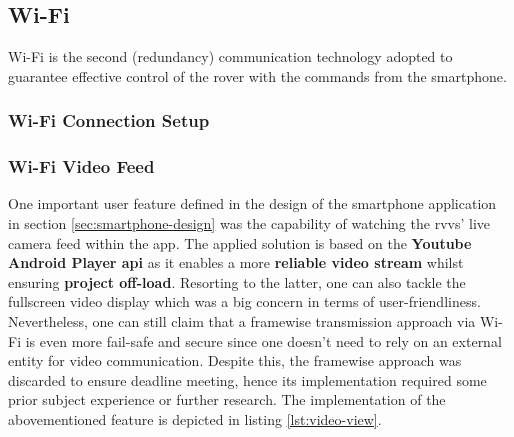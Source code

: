 \subsection{Wi-Fi}%
\label{sec:wifi-implem}
%
Wi-Fi is the second (redundancy) communication technology adopted to guarantee effective control of the rover with the commands from the smartphone.
%
\subsubsection{Wi-Fi Connection Setup}
%
\subsubsection{Wi-Fi Video Feed}
%
One important user feature defined in the design of the smartphone application in section \ref{sec:smartphone-design} was the capability of watching the \gls{rvvs}' live camera feed within the app. The applied solution is based on the \textbf{Youtube Android Player \gls{api}} \cite{yt_api} as it enables a more \textbf{reliable video stream} whilst ensuring \textbf{project off-load}. Resorting to the latter, one can also tackle the fullscreen video display which was a big concern in terms of user-friendliness. Nevertheless, one can still claim that a framewise transmission approach via Wi-Fi is even more fail-safe and secure since one doesn't need to rely on an external entity for video communication.
Despite this, the framewise approach was discarded to ensure deadline meeting, hence its implementation required some prior subject experience or further research. The implementation of the abovementioned feature is depicted in listing \ref{lst:video-view}.\\
%

%
